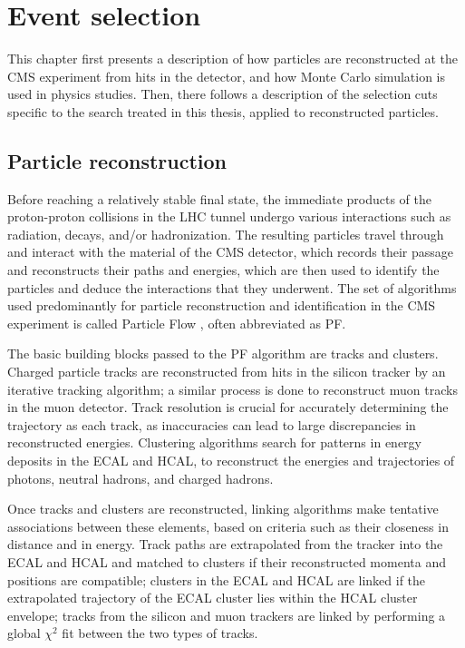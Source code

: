 \chapter{Event selection\label{sec:evtsel}}

This chapter first presents a description of how particles are reconstructed at the CMS experiment from hits in the detector, and how Monte Carlo simulation is used in physics studies. Then, there follows a description of the selection cuts specific to the search treated in this thesis, applied to reconstructed particles.

\section{Particle reconstruction\label{sec:cms-reco}}
Before reaching a relatively stable final state, the immediate products of the proton-proton collisions in the LHC tunnel undergo various interactions such as radiation, decays, and/or hadronization. The resulting particles travel through and interact with the material of the CMS detector, which records their passage and reconstructs their paths and energies, which are then used to identify the particles and deduce the interactions that they underwent. The set of algorithms used predominantly for particle reconstruction and identification in the CMS experiment is called Particle Flow \cite{CMS-PAS-PFT-09-001}, often abbreviated as PF.

The basic building blocks passed to the PF algorithm are tracks and clusters. Charged particle tracks are reconstructed from hits in the silicon tracker by an iterative tracking algorithm; a similar process is done to reconstruct muon tracks in the muon detector. Track resolution is crucial for accurately determining the trajectory as each track, as inaccuracies can lead to large discrepancies in reconstructed energies. Clustering algorithms search for patterns in energy deposits in the ECAL and HCAL, to reconstruct the energies and trajectories of photons, neutral hadrons, and charged hadrons.

Once tracks and clusters are reconstructed, linking algorithms make tentative associations between these elements, based on criteria such as their closeness in distance and in energy. Track paths are extrapolated from the tracker into the ECAL and HCAL and matched to clusters if their reconstructed momenta and positions are compatible; clusters in the ECAL and HCAL are linked if the extrapolated trajectory of the ECAL cluster lies within the HCAL cluster envelope; tracks from the silicon and muon trackers are linked by performing a global $\chi^2$ fit between the two types of tracks.

